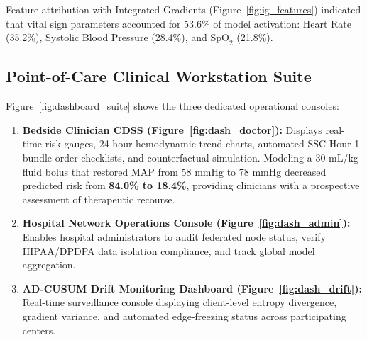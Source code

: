 \documentclass[11pt,a4paper]{article}
\begin{document}
Feature attribution with Integrated Gradients (Figure~\ref{fig:ig_features}) indicated that vital sign parameters accounted for 53.6\% of model activation: Heart Rate (35.2\%), Systolic Blood Pressure (28.4\%), and $\text{SpO}_2$ (21.8\%).

\subsection{Point-of-Care Clinical Workstation Suite}
Figure~\ref{fig:dashboard_suite} shows the three dedicated operational consoles:
\begin{enumerate}[leftmargin=*]
    \item \textbf{Bedside Clinician CDSS (Figure~\ref{fig:dash_doctor}):} Displays real-time risk gauges, 24-hour hemodynamic trend charts, automated SSC Hour-1 bundle order checklists, and counterfactual simulation. Modeling a 30 mL/kg fluid bolus that restored MAP from 58 mmHg to 78 mmHg decreased predicted risk from \textbf{84.0\% to 18.4\%}, providing clinicians with a prospective assessment of therapeutic recourse.
    \item \textbf{Hospital Network Operations Console (Figure~\ref{fig:dash_admin}):} Enables hospital administrators to audit federated node status, verify HIPAA/DPDPA data isolation compliance, and track global model aggregation.
    \item \textbf{AD-CUSUM Drift Monitoring Dashboard (Figure~\ref{fig:dash_drift}):} Real-time surveillance console displaying client-level entropy divergence, gradient variance, and automated edge-freezing status across participating centers.
\end{enumerate}
\end{document}
